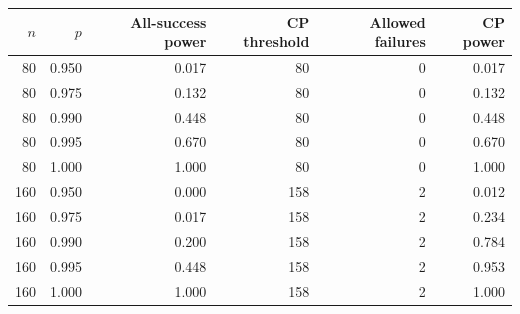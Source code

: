 \begin{tabular}{rrrrrr}
\toprule
$n$ & $p$ & All-success power & CP threshold & Allowed failures & CP power \\
\midrule
80 & 0.950 & 0.017 & 80 & 0 & 0.017 \\
80 & 0.975 & 0.132 & 80 & 0 & 0.132 \\
80 & 0.990 & 0.448 & 80 & 0 & 0.448 \\
80 & 0.995 & 0.670 & 80 & 0 & 0.670 \\
80 & 1.000 & 1.000 & 80 & 0 & 1.000 \\
160 & 0.950 & 0.000 & 158 & 2 & 0.012 \\
160 & 0.975 & 0.017 & 158 & 2 & 0.234 \\
160 & 0.990 & 0.200 & 158 & 2 & 0.784 \\
160 & 0.995 & 0.448 & 158 & 2 & 0.953 \\
160 & 1.000 & 1.000 & 158 & 2 & 1.000 \\
\bottomrule
\end{tabular}
